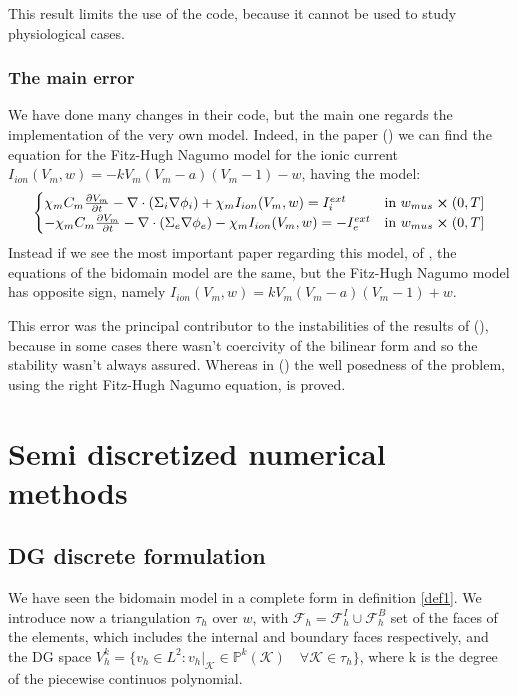 \documentclass[a4paper,12pt]{article}
\begin{document}
This result limits the use of the code, because it cannot be used to study physiological cases.\newline

\subsubsection{The main error}
We have done many changes in their code, but the main one regards the implementation of the very own model. Indeed, in the paper (\cite{acta}) we can find the equation for the Fitz-Hugh Nagumo model for the ionic current $I_{ion}(V_m,w)=-kV_m(V_m-a)(V_m-1)-w$, having the model:
\begin{equation*}
    	\begin{cases}
    	\chi_m C_m\pdv{V_m}{t} - \nabla \cdot (\Sigma_i \nabla \phi_i) + \chi_m I_{ion}(V_m,w) = I_i^{ext}    & \text{in } w_{mus} \cross (0,T]
    	\\
    	-\chi_m C_m\pdv{V_m}{t} - \nabla \cdot (\Sigma_e \nabla \phi_e) - \chi_m I_{ion}(V_m,w) = -I_e^{ext}    & \text{in } w_{mus} \cross (0,T]
    	\end{cases}
\end{equation*}
Instead if we see the most important paper regarding this model, \cite{bourgault} of \citeauthor{bourgault}, the equations of the bidomain model are the same, but the Fitz-Hugh Nagumo model has opposite sign, namely $I_{ion}(V_m,w)=kV_m(V_m-a)(V_m-1)+w$.

This error was the principal contributor to the instabilities of the results of (\cite{marta}), because in some cases there wasn't coercivity of the bilinear form and so the stability wasn't always assured.\newline
Whereas in (\cite{bourgault}) the well posedness of the problem, using the right Fitz-Hugh Nagumo equation, is proved.
    \section{Semi discretized numerical methods}
    \subsection{DG discrete formulation}
    We have seen the bidomain model in a complete form in definition \ref{def1}. We introduce now a triangulation $\tau_h$ over $w$, with $\mathcal{F} _h=\mathcal{F} _h^I \cup \mathcal{F} _h^B$ set of the faces of the elements, which includes the internal and boundary faces respectively, and the DG space $V_h^k = \{v_h \in L^2 : v_h|_\mathcal{K} \in \mathbb{P}^{k}(\mathcal{K})  \quad \forall \mathcal{K} \in \tau_h \}$, where k is the degree of the piecewise continuos polynomial.
    
\end{document}
